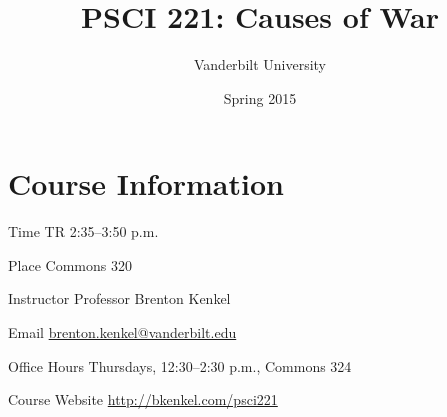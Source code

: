\documentclass[nohyper]{tufte-handout}
\title{PSCI 221: Causes of War}
\author{Vanderbilt University}
\date{Spring 2015}
\begin{document}
\maketitle

\section{Course Information}

\begin{compactdesc}
  \item[Time] TR 2:35--3:50 p.m.
  \item[Place] Commons 320
  \item[Instructor] Professor Brenton Kenkel
  \begin{compactdesc}
    \item[Email] \href{mailto:brenton.kenkel@vanderbilt.edu}{brenton.kenkel@vanderbilt.edu}
    \item[Office Hours] Thursdays, 12:30--2:30 p.m., Commons 324
  \end{compactdesc}
  \item[Course Website] \url{http://bkenkel.com/psci221}
\end{compactdesc}


\end{document}
